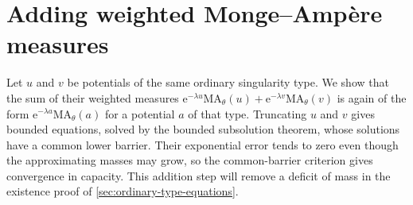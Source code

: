 \section{Adding weighted Monge--Amp\`ere measures}

Let $u$ and $v$ be potentials of the same ordinary singularity type. We show that the sum of their weighted measures $\mathrm{e}^{-\lambda u}\mathrm{MA}_\theta(u)+\mathrm{e}^{-\lambda v}\mathrm{MA}_\theta(v)$ is again of the form $\mathrm{e}^{-\lambda a}\mathrm{MA}_\theta(a)$ for a potential $a$ of that type. Truncating $u$ and $v$ gives bounded equations, solved by the bounded subsolution theorem, whose solutions have a common lower barrier. Their exponential error tends to zero even though the approximating masses may grow, so the common-barrier criterion gives convergence in capacity. This addition step will remove a deficit of mass in the existence proof of \cref{sec:ordinary-type-equations}.

